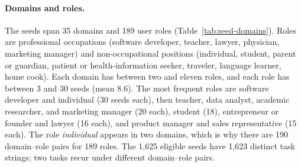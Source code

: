 \documentclass{article} %
\begin{document}
\paragraph{Domains and roles.}
The seeds span 35 domains and 189 user roles (Table~\ref{tab:seed-domains}). Roles are professional occupations (software developer, teacher, lawyer, physician, marketing manager) and non-occupational positions (individual, student, parent or guardian, patient or health-information seeker, traveler, language learner, home cook). Each domain has between two and eleven roles, and each role has between 3 and 30 seeds (mean 8.6). The most frequent roles are software developer and individual (30 seeds each), then teacher, data analyst, academic researcher, and marketing manager (20 each), student (18), entrepreneur or founder and lawyer (16 each), and product manager and sales representative (15 each). The role \emph{individual} appears in two domains, which is why there are 190 domain--role pairs for 189 roles. The 1,625 eligible seeds have 1,623 distinct task strings; two tasks recur under different domain--role pairs.
\end{document}
